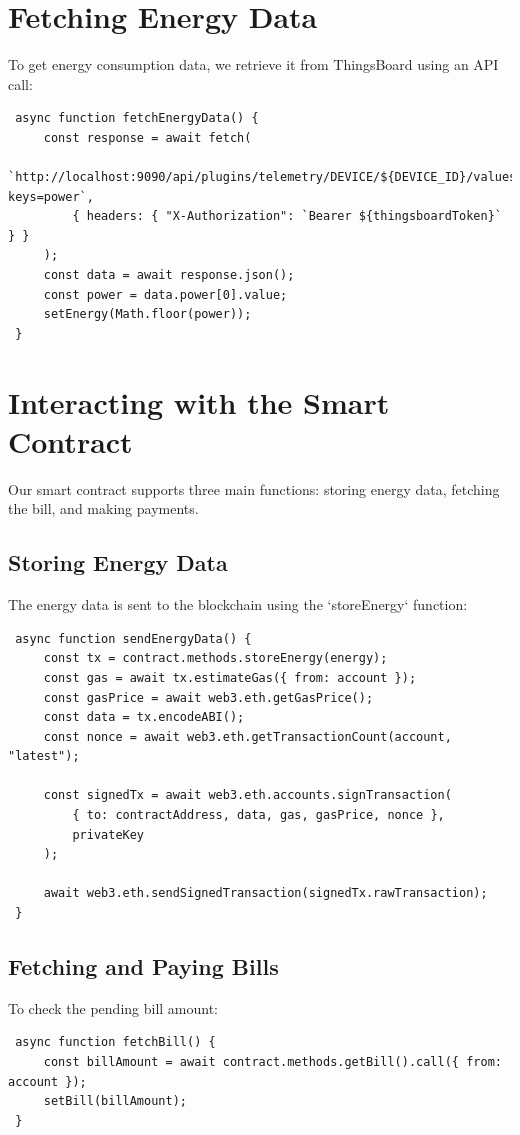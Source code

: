 \documentclass[a4paper,12pt]{report}
\begin{document}
 \section{Fetching Energy Data}
 To get energy consumption data, we retrieve it from ThingsBoard using an API call:
 
 \begin{lstlisting}
 async function fetchEnergyData() {
     const response = await fetch(
         `http://localhost:9090/api/plugins/telemetry/DEVICE/${DEVICE_ID}/values/timeseries?keys=power`,
         { headers: { "X-Authorization": `Bearer ${thingsboardToken}` } }
     );
     const data = await response.json();
     const power = data.power[0].value;
     setEnergy(Math.floor(power));
 }
 \end{lstlisting}
 
 \section{Interacting with the Smart Contract}
 Our smart contract supports three main functions: storing energy data, fetching the bill, and making payments.
 
 \subsection{Storing Energy Data}
 The energy data is sent to the blockchain using the `storeEnergy` function:
 
 \begin{lstlisting}
 async function sendEnergyData() {
     const tx = contract.methods.storeEnergy(energy);
     const gas = await tx.estimateGas({ from: account });
     const gasPrice = await web3.eth.getGasPrice();
     const data = tx.encodeABI();
     const nonce = await web3.eth.getTransactionCount(account, "latest");
 
     const signedTx = await web3.eth.accounts.signTransaction(
         { to: contractAddress, data, gas, gasPrice, nonce },
         privateKey
     );
 
     await web3.eth.sendSignedTransaction(signedTx.rawTransaction);
 }
 \end{lstlisting}
 
 \subsection{Fetching and Paying Bills}
 To check the pending bill amount:
 
 \begin{lstlisting}
 async function fetchBill() {
     const billAmount = await contract.methods.getBill().call({ from: account });
     setBill(billAmount);
 }
 \end{lstlisting}
 
\end{document}
